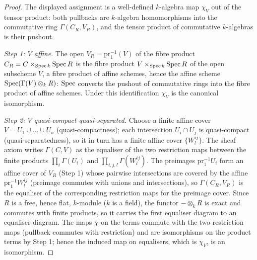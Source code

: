 \begin{proof}
  \leanok
  The displayed assignment is a well-defined \(k\)-algebra map \(\chi_V\) out of the
  tensor product: both pullbacks are \(k\)-algebra homomorphisms into the commutative
  ring \(\Gamma(C_R, V_R)\), and the tensor product of commutative \(k\)-algebras is
  their pushout.

  \emph{Step 1: \(V\) affine.} The open \(V_R = \mathrm{pr}_1^{-1}(V)\) of the fibre
  product \(C_R = C \times_{\operatorname{Spec} k} \operatorname{Spec} R\) is the fibre product
  \(V \times_{\operatorname{Spec} k} \operatorname{Spec} R\) of the open subscheme \(V\), a fibre product of affine
  schemes, hence the affine scheme \(\operatorname{Spec}(\Gamma(V) \otimes_k R)\): \(\operatorname{Spec}\) converts
  the pushout of commutative rings into the fibre product of affine schemes. Under this
  identification \(\chi_V\) is the canonical isomorphism.

  \emph{Step 2: \(V\) quasi-compact quasi-separated.} Choose a finite affine cover
  \(V = U_1 \cup \dots \cup U_n\) (quasi-compactness); each intersection
  \(U_i \cap U_j\) is quasi-compact (quasi-separatedness), so it in turn has a finite
  affine cover \(\{W^{ij}_l\}\). The sheaf axiom writes \(\Gamma(C, V)\) as the
  equaliser of the two restriction maps between the finite products
  \(\prod_i \Gamma(U_i)\) and \(\prod_{i,j,l} \Gamma(W^{ij}_l)\). The preimages
  \(\mathrm{pr}_1^{-1} U_i\) form an affine cover of \(V_R\) (Step 1) whose pairwise
  intersections are covered by the affine \(\mathrm{pr}_1^{-1} W^{ij}_l\) (preimage
  commutes with unions and intersections), so \(\Gamma(C_R, V_R)\) is the equaliser of
  the corresponding restriction maps for the preimage cover. Since \(R\) is a free,
  hence flat, \(k\)-module (\(k\) is a field), the functor \(- \otimes_k R\) is exact
  and commutes with finite products, so it carries the first equaliser diagram to an
  equaliser diagram. The maps \(\chi\) on the terms commute with the two restriction
  maps (pullback commutes with restriction) and are isomorphisms on the product terms by
  Step 1; hence the induced map on equalisers, which is \(\chi_V\), is an isomorphism.
\end{proof}

